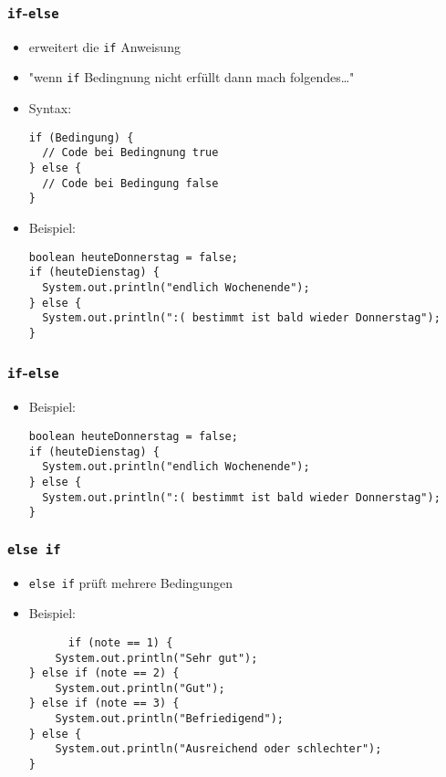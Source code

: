 \documentclass{../../presentation}
\begin{document}
\begin{frame}[fragile]
  \frametitle{\texttt{if}-\texttt{else}}

  \begin{itemize}
    \item<1-> erweitert die \texttt{if} Anweisung
    \item<1-> "wenn \texttt{if} Bedingnung nicht erfüllt dann mach folgendes\dots"
    \item<1-> Syntax:
          \begin{verbatim}
if (Bedingung) {
  // Code bei Bedingnung true
} else {
  // Code bei Bedingung false
}
\end{verbatim}
    \item<2-> Beispiel:
          \begin{verbatim}
boolean heuteDonnerstag = false;
if (heuteDienstag) {
  System.out.println("endlich Wochenende");
} else {
  System.out.println(":( bestimmt ist bald wieder Donnerstag");
}
\end{verbatim}
  \end{itemize}
\end{frame}

\begin{frame}[fragile]
  \frametitle{\texttt{if}-\texttt{else}}
  \begin{itemize}
    \item<1-> Beispiel:
          \begin{verbatim}
boolean heuteDonnerstag = false;
if (heuteDienstag) {
  System.out.println("endlich Wochenende");
} else {
  System.out.println(":( bestimmt ist bald wieder Donnerstag");
}
\end{verbatim}
  \end{itemize}
\end{frame}

\begin{frame}[fragile]
  \frametitle{\texttt{else if}}
  \begin{itemize}
    \item \texttt{else if} prüft mehrere Bedingungen
    \item Beispiel:
          \begin{verbatim}
      if (note == 1) {
    System.out.println("Sehr gut");
} else if (note == 2) {
    System.out.println("Gut");
} else if (note == 3) {
    System.out.println("Befriedigend");
} else {
    System.out.println("Ausreichend oder schlechter");
} 
    \end{verbatim}
  \end{itemize}
\end{frame}
\end{document}
